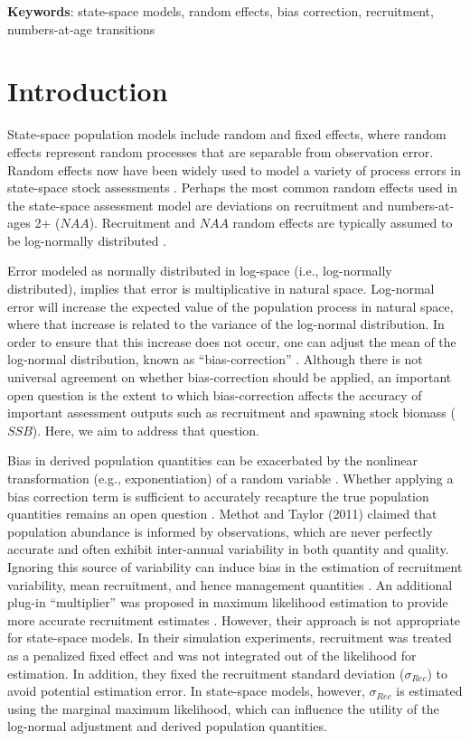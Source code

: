 \documentclass[
  12pt,
]{article}
\begin{document}
\textbf{Keywords}: state-space models, random effects, bias correction,
recruitment, numbers-at-age transitions

\pagebreak

\hypertarget{introduction}{%
\section{Introduction}\label{introduction}}

State-space population models include random and fixed effects, where
random effects represent random processes that are separable from
observation error. Random effects now have been widely used to model a
variety of process errors in state-space stock assessments
\citep{Nielsen2014, Cadigan2015, Stock2021}. Perhaps the most common
random effects used in the state-space assessment model are deviations
on recruitment and numbers-at-ages 2+ (\(NAA\)). Recruitment and \(NAA\)
random effects are typically assumed to be log-normally distributed
\citep{Stock2021}.

Error modeled as normally distributed in log-space (i.e., log-normally
distributed), implies that error is multiplicative in natural space.
Log-normal error will increase the expected value of the population
process in natural space, where that increase is related to the variance
of the log-normal distribution. In order to ensure that this increase
does not occur, one can adjust the mean of the log-normal distribution,
known as ``bias-correction'' \citep{Methot2011}. Although there is not
universal agreement on whether bias-correction should be applied, an
important open question is the extent to which bias-correction affects
the accuracy of important assessment outputs such as recruitment and
spawning stock biomass (\(SSB\)). Here, we aim to address that question.

Bias in derived population quantities can be exacerbated by the
nonlinear transformation (e.g., exponentiation) of a random variable
\citep{Thorson2016}. Whether applying a bias correction term is
sufficient to accurately recapture the true population quantities
remains an open question \citep{Deroba2016}. Methot and Taylor (2011)
claimed that population abundance is informed by observations, which are
never perfectly accurate and often exhibit inter-annual variability in
both quantity and quality. Ignoring this source of variability can
induce bias in the estimation of recruitment variability, mean
recruitment, and hence management quantities
\citep{Methot2011, Thorson2016}. An additional plug-in ``multiplier''
was proposed in maximum likelihood estimation to provide more accurate
recruitment estimates \citep{Methot2011, Thorson2016}. However, their
approach is not appropriate for state-space models. In their simulation
experiments, recruitment was treated as a penalized fixed effect and was
not integrated out of the likelihood for estimation. In addition, they
fixed the recruitment standard deviation (\(\sigma_{Rec}\)) to avoid
potential estimation error. In state-space models, however,
\(\sigma_{Rec}\) is estimated using the marginal maximum likelihood,
which can influence the utility of the log-normal adjustment and derived
population quantities.
\end{document}
